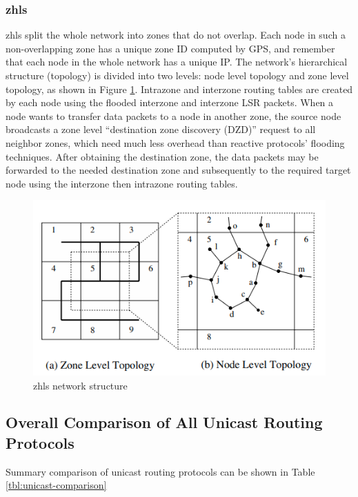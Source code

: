 \subsubsection{\acrfull{zhls}}
\acrfull{zhls} split the whole network into zones that do not overlap. Each node in such a non-overlapping zone has a unique zone ID computed by GPS, and remember that each node in the whole network has a unique IP. The network's hierarchical structure (topology) is divided into two levels: node level topology and zone level topology, as shown in Figure \ref{fig:zhls}. Intrazone and interzone routing tables are created by each node using the flooded interzone and interzone LSR packets. When a node wants to transfer data packets to a node in another zone, the source node broadcasts a zone level “destination zone discovery (DZD)” request to all neighbor zones, which need much less overhead than reactive protocols' flooding techniques. After obtaining the destination zone, the data packets may be forwarded to the needed destination zone and subsequently to the required target node using the interzone then intrazone routing tables.\cite{joa1999peer} \cite{garg2012review} \cite{bansal2011performance} \cite{kamidate2007fault}

\begin{figure}[!htb]
    \centering
    \includegraphics[scale=0.8]{images/zhls.png}
    \caption{\acrshort{zhls} network structure}
    \label{fig:zhls}
\end{figure}

\subsection{Overall Comparison of All Unicast
Routing Protocols }

Summary comparison of unicast routing protocols can be shown in Table \ref{tbl:unicast-comparison}
  
